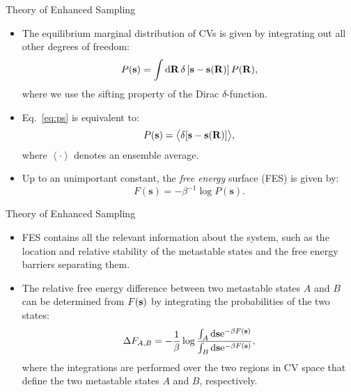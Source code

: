 \documentclass[10pt]{beamer}
\begin{document}
\begin{frame}{Theory of Enhanced Sampling}
\begin{itemize}
\setlength\itemsep{1em}
  \item The equilibrium marginal distribution of CVs is given by integrating out all other degrees of freedom:
  \begin{align}
  \label{eq:ps}
    P(\mathbf{s}) =
      \int \mathrm{d}\mathbf{R} \, \delta
        \left[
          \mathbf{s} - \mathbf{s}(\mathbf{R})
        \right]
      P(\mathbf{R}),
  \end{align}
  where we use the sifting property of the Dirac $\delta$-function.

  \item Eq.~\ref{eq:ps} is equivalent to:
  \begin{equation}
    P({\bf s}) = \big< \delta[\mathbf{s}-\mathbf{s(R)}] \big>,
  \end{equation}
  where $\left<\cdot\right>$ denotes an ensemble average.

  \item Up to an unimportant constant, the \textit{free energy} surface (FES) is given by:
  \begin{equation}
    F(\mathbf{s})= -\beta^{-1} \log P(\mathbf{s}).
  \end{equation}
\end{itemize}
\end{frame}

\begin{frame}{Theory of Enhanced Sampling}
\begin{itemize}
\setlength\itemsep{1em}
  \item FES contains all the relevant information about the system, such as the location and relative stability of the metastable states and the free energy barriers separating them.

  \item The relative free energy difference between two metastable states $A$ and $B$ can be determined from $F({\bf s})$ by integrating the probabilities of the two states:
  \begin{equation}
    \Delta F_{A,B} = -\frac{1}{\beta}\log\frac{\int_A \mathrm{d}{\bf s}\mathrm{e}^{-\beta F({\bf s})}}{\int_B \mathrm{d}{\bf s}\mathrm{e}^{-\beta F({\bf s})}},
  \end{equation}
  where the integrations are performed over the two regions in CV space that define the two metastable states $A$ and $B$, respectively.
\end{itemize}
\end{frame}
\end{document}
